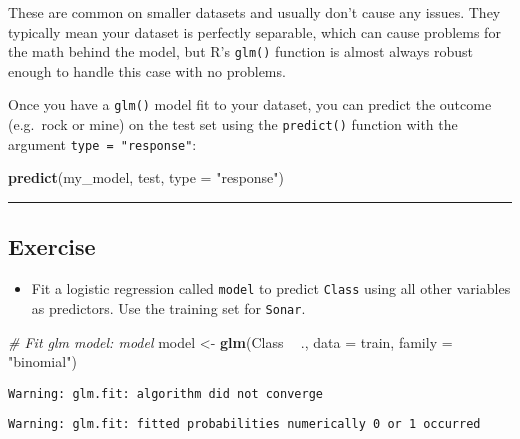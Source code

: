 \documentclass[
]{book}
\newenvironment{Shaded}{\begin{snugshade}}{\end{snugshade}}
\newcommand{\CommentTok}[1]{\textcolor[rgb]{0.56,0.35,0.01}{\textit{#1}}}
\newcommand{\DataTypeTok}[1]{\textcolor[rgb]{0.13,0.29,0.53}{#1}}
\newcommand{\KeywordTok}[1]{\textcolor[rgb]{0.13,0.29,0.53}{\textbf{#1}}}
\newcommand{\NormalTok}[1]{#1}
\newcommand{\OperatorTok}[1]{\textcolor[rgb]{0.81,0.36,0.00}{\textbf{#1}}}
\newcommand{\StringTok}[1]{\textcolor[rgb]{0.31,0.60,0.02}{#1}}
\providecommand{\tightlist}{%
  \setlength{\itemsep}{0pt}\setlength{\parskip}{0pt}}
\begin{document}
These are common on smaller datasets and usually don't cause any issues. They typically mean your dataset is perfectly separable, which can cause problems for the math behind the model, but R's \texttt{glm()} function is almost always robust enough to handle this case with no problems.

Once you have a \texttt{glm()} model fit to your dataset, you can predict the outcome (e.g.~rock or mine) on the test set using the \texttt{predict()} function with the argument \texttt{type\ =\ "response"}:

\begin{Shaded}
\begin{Highlighting}[]
\KeywordTok{predict}\NormalTok{(my_model, test, }\DataTypeTok{type =} \StringTok{"response"}\NormalTok{)}
\end{Highlighting}
\end{Shaded}

\begin{center}\rule{0.5\linewidth}{0.5pt}\end{center}

\hypertarget{exercise-10}{%
\subsection*{Exercise}\label{exercise-10}}

\begin{itemize}
\tightlist
\item
  Fit a logistic regression called \texttt{model} to predict \texttt{Class} using all other variables as predictors. Use the training set for \texttt{Sonar}.
\end{itemize}

\begin{Shaded}
\begin{Highlighting}[]
\CommentTok{# Fit glm model: model}
\NormalTok{model <-}\StringTok{ }\KeywordTok{glm}\NormalTok{(Class }\OperatorTok{~}\StringTok{ }\NormalTok{., }\DataTypeTok{data =}\NormalTok{ train, }\DataTypeTok{family =} \StringTok{"binomial"}\NormalTok{)}
\end{Highlighting}
\end{Shaded}

\begin{verbatim}
Warning: glm.fit: algorithm did not converge
\end{verbatim}

\begin{verbatim}
Warning: glm.fit: fitted probabilities numerically 0 or 1 occurred
\end{verbatim}
\end{document}
